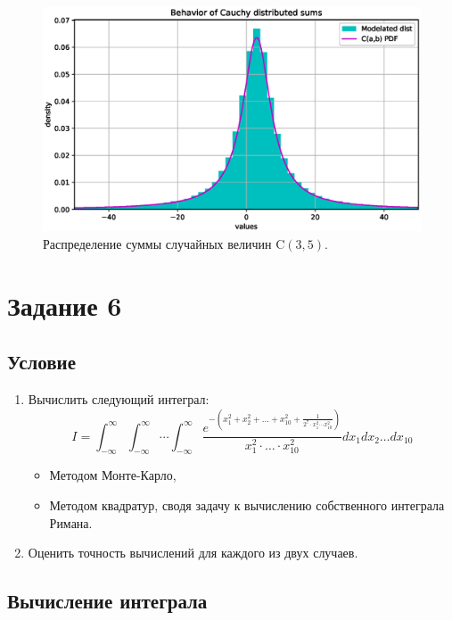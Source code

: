 \documentclass[11pt]{report}
\begin{document}
\begin{figure}[H]
    \centering
    \includegraphics[width=0.9\linewidth]{images/cauchy-sum.eps}
    \caption{Распределение суммы случайных величин $\mathrm{C}(3,5)$.}
    \label{fig:cauchy-sum}
\end{figure}

\section{Задание 6}

\subsection{Условие}

\begin{enumerate}
\item Вычислить следующий интеграл:
$$
I = \int_{-\infty}^{\infty}\int_{-\infty}^{\infty}\cdots\int_{-\infty}^{\infty}
\dfrac{e^{-(x_1^2+x_2^2+\dots+x_{10}^2 + \frac{1}{2^7\cdot x_1^2\cdots x_{10}^2})}}{x_1^2\cdot\dots\cdot x_{10}^2}
dx_1dx_2\dots dx_{10}
$$
\begin{itemize}
\item Методом Монте-Карло,
\item Методом квадратур, сводя задачу к вычислению собственного интеграла Римана.
\end{itemize}
\item Оценить точность вычислений для каждого из двух случаев.
\end{enumerate}

\subsection{Вычисление интеграла}
\end{document}
